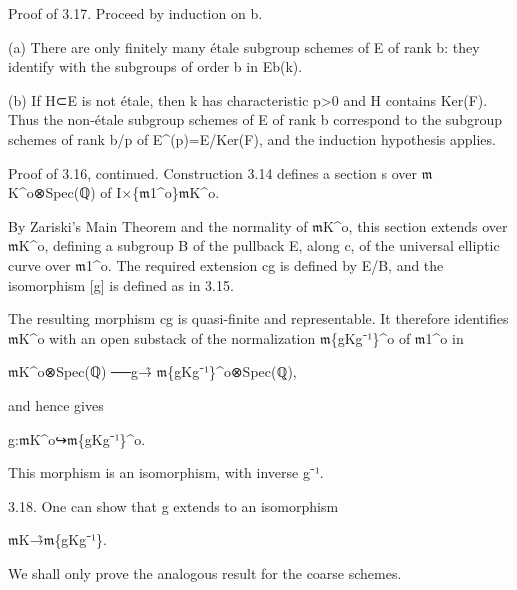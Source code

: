 \documentclass[11pt,a4paper]{article}
\begin{document}
Proof of 3.17. Proceed by induction on b.

(a) There are only finitely many étale subgroup schemes of E of rank b: they identify with the subgroups of order b in E\textunderscore{}b(k).

(b) If H⊂E is not étale, then k has characteristic p>0 and H contains Ker(F). Thus the non-étale subgroup schemes of E of rank b correspond to the subgroup schemes of rank b/p of E\textasciicircum{}(p)=E/Ker(F), and the induction hypothesis applies.

Proof of 3.16, continued. Construction 3.14 defines a section s over \ensuremath{\mathfrak{m}}\textunderscore{}K\textasciicircum{}o⊗Spec(ℚ) of I×\textunderscore{}\{\ensuremath{\mathfrak{m}}\textunderscore{}1\textasciicircum{}o\}\ensuremath{\mathfrak{m}}\textunderscore{}K\textasciicircum{}o.

By Zariski's Main Theorem and the normality of \ensuremath{\mathfrak{m}}\textunderscore{}K\textasciicircum{}o, this section extends over \ensuremath{\mathfrak{m}}\textunderscore{}K\textasciicircum{}o, defining a subgroup B of the pullback E, along c, of the universal elliptic curve over \ensuremath{\mathfrak{m}}\textunderscore{}1\textasciicircum{}o. The required extension cg is defined by E/B, and the isomorphism [g] is defined as in 3.15.

The resulting morphism cg is quasi-finite and representable. It therefore identifies \ensuremath{\mathfrak{m}}\textunderscore{}K\textasciicircum{}o with an open substack of the normalization \ensuremath{\mathfrak{m}}\textunderscore{}\{gKg⁻¹\}\textasciicircum{}o of \ensuremath{\mathfrak{m}}\textunderscore{}1\textasciicircum{}o in

\ensuremath{\mathfrak{m}}\textunderscore{}K\textasciicircum{}o⊗Spec(ℚ) ──g→̃ \ensuremath{\mathfrak{m}}\textunderscore{}\{gKg⁻¹\}\textasciicircum{}o⊗Spec(ℚ),

and hence gives

g:\ensuremath{\mathfrak{m}}\textunderscore{}K\textasciicircum{}o↪\ensuremath{\mathfrak{m}}\textunderscore{}\{gKg⁻¹\}\textasciicircum{}o.

This morphism is an isomorphism, with inverse g⁻¹.

3.18. One can show that g extends to an isomorphism

\ensuremath{\mathfrak{m}}\textunderscore{}K→̃\ensuremath{\mathfrak{m}}\textunderscore{}\{gKg⁻¹\}.

We shall only prove the analogous result for the coarse schemes.
\end{document}

